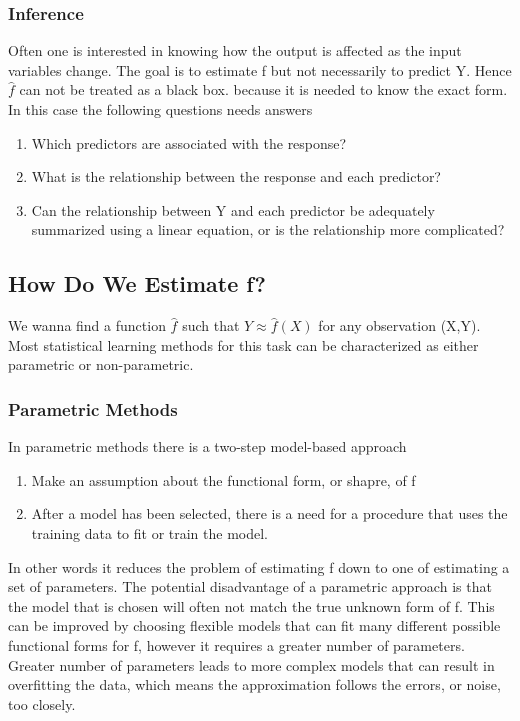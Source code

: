 \documentclass[12pt]{article}
\numberwithin{equation}{section}
\begin{document}
\subsubsection{Inference}
Often one is interested in knowing how the output is affected as the input variables change. The goal is to estimate f but not necessarily to predict Y. Hence $\hat{f}$ can not be treated as a black box. because it is needed to know the exact form. In this case the following questions needs answers
\begin{enumerate}
    \item Which predictors are associated with the response?
    \item What is the relationship between the response and each predictor?
    \item Can the relationship between Y and each predictor be adequately summarized using a linear equation, or is the relationship more complicated?
\end{enumerate}
\subsection{How Do We Estimate f?}
We wanna find a function $\hat{f}$ such that $Y \approx \hat{f}(X)$ for any observation (X,Y). Most statistical learning methods for this task can be characterized as either parametric or non-parametric.
\subsubsection{Parametric Methods}
In parametric methods there is a two-step model-based approach
\begin{enumerate}
    \item Make an assumption about the functional form, or shapre, of f
    \item After a model has been selected, there is a need for a procedure that uses the training data to fit or train the model.
\end{enumerate}
In other words it reduces the problem of estimating f down to one of estimating a set of parameters. The potential disadvantage of a parametric approach is that the model that is chosen will often not match the true unknown form of f. This can be improved by choosing flexible models that can fit many different possible functional forms for f, however it requires a greater number of parameters. Greater number of parameters leads to more complex models that can result in overfitting the data, which means the approximation follows the errors, or noise, too closely.
\end{document}
